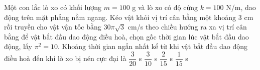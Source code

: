 
%



















\begin{ex}%
Một con lắc lò xo có khối lượng $m=100$ g và lò xo có độ cứng $k=100$ N/m, dao động trên mặt phẳng nằm ngang. Kéo vật khỏi vị trí cân bằng một khoảng 3 cm rồi truyền cho vật vận tốc bằng $30\pi \sqrt{3}$ cm/s theo chiều hướng ra xa vị trí cân bằng để vật bắt đầu dao động điều hoà, chọn gốc thời gian lúc vật bắt đầu dao động, lấy $\pi ^2=10$. Khoảng thời gian ngắn nhất kể từ khi vật bắt đầu dao động điều hoà đến khi lò xo bị nén cực đại là
\choice
{$\dfrac{3}{20}$ s}
{$\dfrac{3}{10}$ s}
{\True $\dfrac{2}{15}$ s}
{$\dfrac{1}{15}$ s}
\end{ex} 














